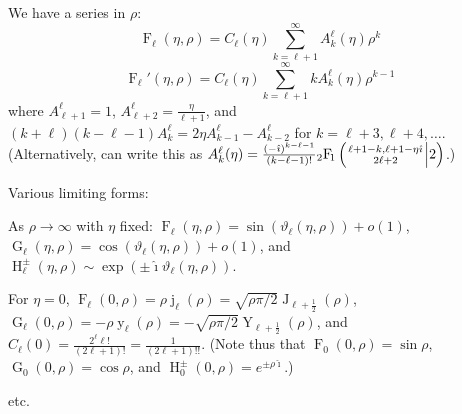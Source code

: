\documentclass[10pt,dvipdfmx,letterpaper,twoside]{article}
\let\O=\operatorname
\newcommand{\ii}{{\hat{\imath}}}
\newcommand{\Hyper}[5]{{\mathop{{}_{#1}\!\O{F\!}_{#2}\left({\genfrac{}{}{0pt}{}{#3}{#4}}\middle|{#5}\right)}}}
\let\theta=\vartheta
\begin{document}
We have a series in $\rho$:
\[ \O{F}_\ell(\eta,\rho) = C_\ell(\eta) \sum_{k=\ell+1}^\infty A^\ell_k(\eta) \rho^k \]
\[ \O{F}_\ell'(\eta,\rho) = C_\ell(\eta) \sum_{k=\ell+1}^\infty k A^\ell_k(\eta) \rho^{k-1} \]
where
$A^\ell_{\ell+1} = 1$, $A^\ell_{\ell+2} = \frac{\eta}{\ell+1}$, and
$(k+\ell)(k-\ell-1)A^\ell_k = 2\eta A^\ell_{k-1} - A^\ell_{k-2}$ for $k=\ell+3, \ell+4, \dots$.
(Alternatively, can write this as $A^\ell_k(\eta) = \frac{(-\ii)^{k-\ell-1}}{(k-\ell-1)!} \Hyper{2}{1}{\ell+1-k, \ell+1-\eta\ii}{2\ell+2}{2}$.)

Various limiting forms:

As $\rho\to\infty$ with $\eta$ fixed:
$\O{F}_\ell(\eta,\rho) = \sin( \theta_\ell(\eta,\rho) ) + o(1)$,
$\O{G}_\ell(\eta,\rho) = \cos( \theta_\ell(\eta,\rho) ) + o(1)$, and
$\O{H}^\pm_\ell(\eta,\rho) \sim \exp( \pm\ii\theta_\ell(\eta,\rho) )$.

For $\eta=0$,
$\O{F}_\ell(0,\rho) = \rho \O{j}_\ell(\rho) = \sqrt{\rho\pi/2} \O{J}_{\ell+\tfrac12}(\rho)$,
$\O{G}_\ell(0,\rho) = -\rho \O{y}_\ell(\rho) = -\sqrt{\rho\pi/2} \O{Y}_{\ell+\tfrac12}(\rho)$, and
$C_\ell(0) = \frac{2^\ell \ell!}{(2\ell+1)!} = \frac{1}{(2\ell+1)!!}$.
(Note thus that $\O{F}_0(0,\rho) = \sin\rho$, $\O{G}_0(0,\rho) = \cos\rho$, and $\O{H}^\pm_0(0,\rho)=e^{\pm\rho\ii}$.)

etc.

\end{document}
